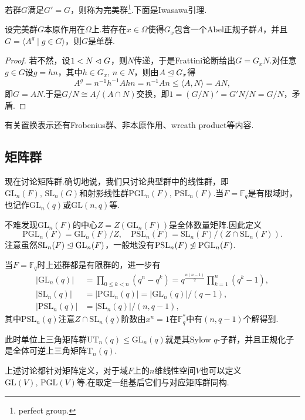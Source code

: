 若群$G$满足$G'=G$，则称为{\heiti 完美群}\footnote{perfect group.}.下面是Iwasawa引理.
\begin{lemma*}[(Iwasawa)]
	设完美群$G$本原作用在$\Omega$上.若存在$x\in\Omega$使得$G_x$包含一个Abel正规子群$A$，并且$G=\langle A^g\mid g\in G\rangle $，则$G$是单群.\hypertarget{lemma:Iwasawa}{}
\end{lemma*}
\begin{proof}
	若不然，设$1<N\vartriangleleft G$，则$N$传递，于是Frattini论断给出$G=G_xN$.对任意$g\in G$设$g=hn$，其中$h\in G_x,\,n\in N$，则由$A\trianglelefteq G_x$得
	\[
		A^g=n^{-1}h^{-1}Ahn=n^{-1}An\le\langle A,N\rangle=AN,
	\]
	即$G=AN$.于是$G/N\cong A/(A\cap N)$交换，即$1=(G/N)'=G'N/N=G/N$，矛盾.
\end{proof}

\begin{remark}
	有关置换表示还有Frobenius群、非本原作用、wreath product等内容.
\end{remark}

\subsection{矩阵群}\label{subsec:MatrixGrp}
现在讨论矩阵群.确切地说，我们只讨论典型群中的{\heiti 线性群}，即$\mathrm{GL}_n(F),\,\mathrm{SL}_n(G)$和射影线性群$\mathrm{PGL}_n(F),\,\mathrm{PSL}_n(F)$.当$F=\mathbb{F}_q$是有限域时，也记作$\mathrm{GL}_n(q)$或$\mathrm{GL}(n,q)$等.

不难发现$\mathrm{GL}_n(F)$的中心$Z=Z(\mathrm{GL}_n(F))$是全体数量矩阵.因此定义
\[
	\mathrm{PGL}_n(F)=\mathrm{GL}_n(F)/Z,\quad\mathrm{PSL}_n(F)=\mathrm{SL}_n(F)/(Z\cap\mathrm{SL}_n(F)).
\]
注意虽然$\mathrm{SL}_n(F)\trianglelefteq\mathrm{GL}_n(F)$，一般地没有$\mathrm{PSL}_n(F)\not\trianglelefteq\mathrm{PGL}_n(F)$.

当$F=\mathbb{F}_q$时上述群都是有限群的，进一步有
\begin{align*}
	|\mathrm{GL}_n(q)|&=\prod_{0\le k<n}(q^n-q^k)=q^{\frac{n(n-1)}{2}}\prod_{k=1}^n(q^k-1),\\
	|\mathrm{SL}_n(q)|&=|\mathrm{PGL}_n(q)|=|\mathrm{GL}_n(q)|/(q-1),\\
	|\mathrm{PSL}_n(q)|&=|\mathrm{SL}_n(q)|/(n,q-1),
\end{align*}
其中$\mathrm{PSL}_n(q)$注意$Z\cap\mathrm{SL}_n(q)$阶数由$x^n=1$在$\mathbb{F}_q^*$中有$(n,q-1)$个解得到.

此时单位上三角矩阵群$\mathrm{UT}_n(q)\le\mathrm{GL}_n(q)$就是其Sylow $q$-子群，并且正规化子是全体可逆上三角矩阵$\mathrm{T}_n(q)$.

上述讨论都针对矩阵定义，对于域$F$上的$n$维线性空间$V$也可以定义$\mathrm{GL}(V),\,\mathrm{PGL}(V)$等.在取定一组基后它们与对应矩阵群同构.

